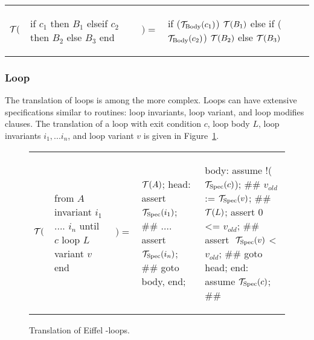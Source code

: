 \begin{center}
\begin{tabular}{llll}
$\mathcal{T}($
&
{\begin{erunning}
if $c_1$ then $B_1$
elseif $c_2$ then $B_2$
else $B_3$
end
\end{erunning}}
&
$)=$
&
{\begin{brunning}
if ($\ts{Body}{c_1}$) { $\tr{B_1}$ }
else {
	if ($\ts{Body}{c_2}$) { $\tr{B_2}$ }
	else { $\tr{B_3}$ }
}
\end{brunning}}
\end{tabular}
\end{center}


\subsubsection{Loop}

The translation of loops is among the more complex. Loops can have extensive specifications similar to routines: loop invariants, loop variant, and loop modifies clauses. The translation of a loop with exit condition $c$, loop body $L$, loop invariants $i_1, ... i_n$, and loop variant $v$
is given in Figure~\ref{fig:translation-loops}.

\begin{figure}[!hbt]
\begin{tabular}{lllll}
$\mathcal{T}($
&
{\begin{erunning}
from $A$
invariant
	$i_1$
	....
	$i_n$
until $c$
loop $L$
variant $v$
end
\end{erunning}}
&
$)=$
&
\hspace{5pt}
{\begin{brunning}[numbers=left,numbersep=5pt]
  $\tr{A}$;
head:
  assert $\ts{Spec}{i_1}$; #\label{l:loop-invar-start}#
  ....
  assert $\ts{Spec}{i_n}$; #\label{l:loop-invar-end}#
  goto body, end;
\end{brunning}}
&
\hspace{12pt}
{\begin{brunning}[numbers=left,firstnumber=last,numbersep=5pt]
body:
  assume !($\ts{Spec}{c}$); #\label{l:loop-cond-neg}#
  $v_{old}$ := $\ts{Spec}{v}$; #\label{l:loop-var-old}#
  $\tr{L}$;
  assert 0 <= $v_{old}$; #\label{l:loop-var-bounded}#
  assert $\ \ts{Spec}{v}$ < $v_{old}$; #\label{l:loop-var-decreases}#
  goto head;
end:
  assume $\ts{Spec}{c}$; #\label{l:loop-cond}#
\end{brunning}}
\end{tabular}
\caption{Translation of Eiffel -loops.}
\label{fig:translation-loops}
\end{figure}

